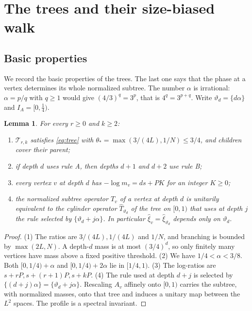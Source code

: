 \documentclass[11pt]{article}
\newtheorem{lemma}[theorem]{Lemma}
\theoremstyle{definition}
\theoremstyle{remark}
\newcommand{\cyl}{\mathcal T}
\newcommand{\fr}[1]{\{#1\}}
\begin{document}
\section{The trees and their size-biased walk}\label{sec:walk}

\subsection{Basic properties}
We record the basic properties of the trees. The last one says that the
phase at a vertex determines its whole normalized subtree.
The number $\alpha$ is irrational: $\alpha=p/q$ with $q\ge1$ would give
$(4/3)^q=3^p$, that is $4^q=3^{p+q}$. Write $\vartheta_d=\fr{d\alpha}$ and
$I_A=[0,\frac14)$.

\begin{lemma}\label{lem:basic}
For every $r\ge0$ and $k\ge2$:
\begin{enumerate}
\item $\cyl_{r,k}$ satisfies \eqref{eq:tree} with $\theta_*=\max(3/(4L),1/N)\le3/4$, and children
 cover their parent;
\item if depth $d$ uses rule A, then depths $d+1$ and $d+2$ use rule B;
\item every vertex $v$ at depth $d$ has $-\log m_v=ds+PK$ for an integer
 $K\ge0$;
\item the normalized subtree operator $\widehat T_v$ of a vertex at depth $d$
 is unitarily equivalent to the cylinder operator $\widehat T_{\vartheta_d}$
 of the tree on $[0,1)$ that uses at depth $j$ the rule selected by
 $\fr{\vartheta_d+j\alpha}$. In particular $\widehat\xi_v=\widehat\xi_{\vartheta_d}$
 depends only on $\vartheta_d$.
\end{enumerate}
\end{lemma}
\begin{proof}
(1) The ratios are $3/(4L),1/(4L)$ and $1/N$, and branching is
bounded by $\max(2L,N)$. A depth-$d$ mass is at most $(3/4)^d$, so only
finitely many vertices have mass above a fixed positive threshold.
(2) We have $1/4<\alpha<3/8$. Both $[0,1/4)+\alpha$ and
$[0,1/4)+2\alpha$ lie in $[1/4,1)$.
(3) The log-ratios are $s+rP,s+(r+1)P,s+kP$.
(4) The rule used at depth $d+j$ is selected by
$\fr{(d+j)\alpha}=\fr{\vartheta_d+j\alpha}$. Rescaling $A_v$ affinely onto
$[0,1)$ carries the subtree, with normalized masses, onto that tree and
induces a unitary map between the $L^2$ spaces. The profile is a spectral
invariant.
\end{proof}
\end{document}
